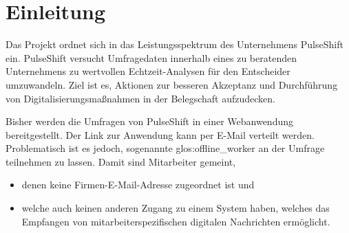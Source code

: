 \section{Einleitung}

Das Projekt ordnet sich in das Leistungsspektrum des Unternehmens PulseShift ein. PulseShift versucht Umfragedaten innerhalb eines zu beratenden Unternehmens zu wertvollen Echtzeit-Analysen für den Entscheider umzuwandeln. Ziel ist es, Aktionen zur besseren Akzeptanz und Durchführung von Digitalisierungsmaßnahmen in der Belegschaft aufzudecken. 

Bisher werden die Umfragen von PulseShift in einer Webanwendung bereitgestellt. Der Link zur Anwendung kann per E-Mail verteilt werden. Problematisch ist es jedoch, sogenannte \gls{glos:offline_worker} an der Umfrage teilnehmen zu lassen. Damit sind Mitarbeiter gemeint, 

\begin{itemize}
\item denen keine Firmen-E-Mail-Adresse zugeordnet ist und
\item welche auch keinen anderen Zugang zu einem System haben, welches das Empfangen von mitarbeiterspezifischen digitalen Nachrichten ermöglicht.
\end{itemize}
 
